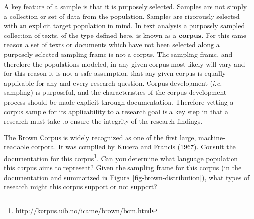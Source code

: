 \documentclass[
  letterpaper,
]{scrbook}
\DeclareRobustCommand{\href}[2]{#2\footnote{\url{#1}}}
\begin{document}
A key feature of a sample is that it is purposely selected. Samples are
not simply a collection or set of data from the population. Samples are
rigorously selected with an explicit target population in mind. In text
analysis a purposely sampled collection of texts, of the type defined
here, is known as a \textbf{corpus.} For this same reason a set of texts
or documents which have not been selected along a purposely selected
sampling frame is not a corpus. The sampling frame, and therefore the
populations modeled, in any given corpus most likely will vary and for
this reason it is not a safe assumption that any given corpus is equally
applicable for any and every research question. Corpus development
(\emph{i.e.} sampling) is purposeful, and the characteristics of the
corpus development process should be made explicit through
documentation. Therefore vetting a corpus sample for its applicability
to a research goal is a key step in that a research must take to ensure
the integrity of the research findings.

\begin{tcolorbox}[enhanced jigsaw, title=\textcolor{quarto-callout-important-color}{\faExclamation}\hspace{0.5em}{Consider}, breakable, colback=white, colframe=quarto-callout-important-color-frame, bottomrule=.15mm, left=2mm, bottomtitle=1mm, colbacktitle=quarto-callout-important-color!10!white, opacityback=0, arc=.35mm, toprule=.15mm, coltitle=black, leftrule=.75mm, opacitybacktitle=0.6, toptitle=1mm, titlerule=0mm, rightrule=.15mm]

The Brown Corpus is widely recognized as one of the first large,
machine-readable corpora. It was compiled by Kucera and Francis (1967).
Consult the
\href{http://korpus.uib.no/icame/brown/bcm.html}{documentation for this
corpus}. Can you determine what language population this corpus aims to
represent? Given the sampling frame for this corpus (in the
documentation and summarized in Figure~\ref{fig-brown-distribution}),
what types of research might this corpus support or not support?

\end{tcolorbox}
\end{document}
